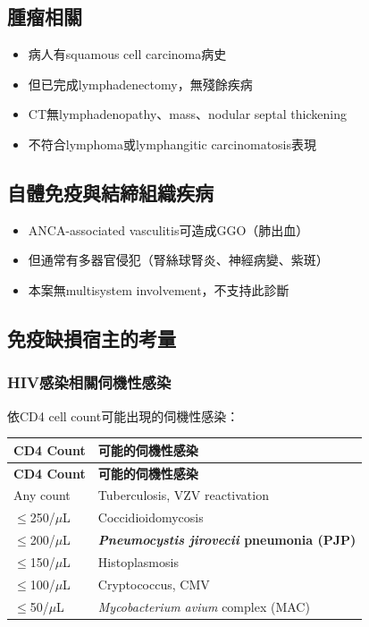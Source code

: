 \documentclass[12pt,a4paper]{article}
\begin{document}
\subsection{腫瘤相關}
\begin{itemize}
    \item 病人有squamous cell carcinoma病史
    \item 但已完成lymphadenectomy，無殘餘疾病
    \item CT無lymphadenopathy、mass、nodular septal thickening
    \item 不符合lymphoma或lymphangitic carcinomatosis表現
\end{itemize}

\subsection{自體免疫與結締組織疾病}
\begin{itemize}
    \item ANCA-associated vasculitis可造成GGO（肺出血）
    \item 但通常有多器官侵犯（腎絲球腎炎、神經病變、紫斑）
    \item 本案無multisystem involvement，不支持此診斷
\end{itemize}

\subsection{免疫缺損宿主的考量}


\subsubsection{HIV感染相關伺機性感染}
依CD4 cell count可能出現的伺機性感染：
\begin{longtable}{p{5cm}p{9cm}}
\toprule
\textbf{CD4 Count} & \textbf{可能的伺機性感染} \\
\midrule
\endfirsthead
\toprule
\textbf{CD4 Count} & \textbf{可能的伺機性感染} \\
\midrule
\endhead
\bottomrule
\endfoot
Any count & Tuberculosis, VZV reactivation \\
$\leq$250/$\mu$L & Coccidioidomycosis \\
$\leq$200/$\mu$L & \textbf{\textit{Pneumocystis jirovecii} pneumonia (PJP)} \\
$\leq$150/$\mu$L & Histoplasmosis \\
$\leq$100/$\mu$L & Cryptococcus, CMV \\
$\leq$50/$\mu$L & \textit{Mycobacterium avium} complex (MAC) \\
\end{longtable}
\end{document}
